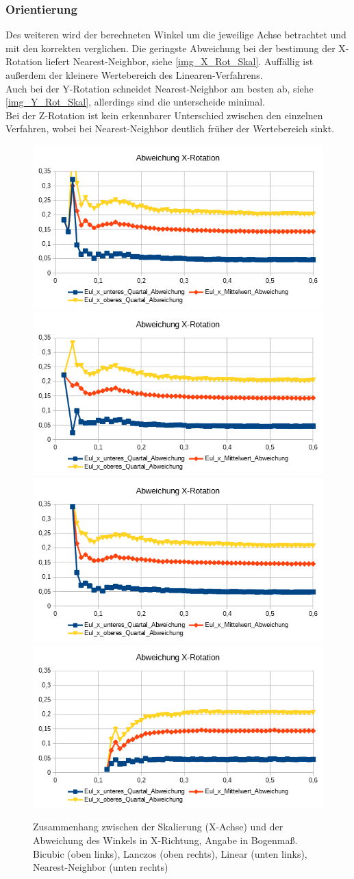 \subsubsection{Orientierung}
Des weiteren wird der berechneten Winkel um die jeweilige Achse betrachtet und mit den korrekten verglichen. Die geringste Abweichung bei der bestimung der X-Rotation liefert Nearest-Neighbor, siehe \autoref{img_X_Rot_Skal}. Auffällig ist außerdem der kleinere Wertebereich des Linearen-Verfahrens.\\
Auch bei der Y-Rotation schneidet Nearest-Neighbor am besten ab, siehe \autoref{img_Y_Rot_Skal}, allerdings sind die unterscheide minimal.\\
Bei der Z-Rotation ist kein erkennbarer Unterschied zwischen den einzelnen Verfahren, wobei bei Nearest-Neighbor deutlich früher der Wertebereich sinkt.
\begin{figure}
	\centering
	\includegraphics[width=0.45\linewidth]{tabelle2/X_Rot_Cubic}
	\includegraphics[width=0.45\linewidth]{tabelle2/X_Rot_Lanc}
	\includegraphics[width=0.45\linewidth]{tabelle2/X_Rot_Linear}
	\includegraphics[width=0.45\linewidth]{tabelle2/X_Rot_NN}
	\caption{Zusammenhang zwischen der Skalierung (X-Achse) und der Abweichung des Winkels in X-Richtung, Angabe in Bogenmaß. 
		Bicubic (oben links), Lanczos (oben rechts), Linear (unten links), Nearest-Neighbor (unten rechts)}
	\label{img_X_Rot_Skal}
\end{figure}
